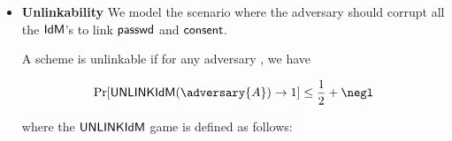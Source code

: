 \begin{itemize}
\begin{definition}
\end{definition}

  \item \textbf{Unlinkability} We model the scenario where the adversary should corrupt all the $\textsf{IdM}$'s to link $\textsf{passwd}$ and $\mathsf{consent}$.

\begin{definition}[Unlinkability]
A \primitive scheme is unlinkable if for any \ppt adversary  , we have

\begin{align*}
    \Pr[\unlinkidm(\adversary{A}) \rightarrow 1] \le \frac{1}{2} + \negl
\end{align*}

where the $\mathsf{UNLINK}\textsf{IdM}$ game is defined as follows:

\begin{pchstack}[center, space=0.2cm, boxed]
\begin{pcvstack}


\end{pcvstack}
\end{pchstack}
\end{definition}
\end{itemize}
